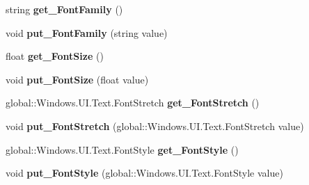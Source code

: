 \begin{DoxyCompactItemize}
string {\bfseries get\+\_\+\+Font\+Family} ()
\item 
\mbox{\label{class_microsoft_1_1_graphics_1_1_canvas_1_1_text_1_1_canvas_text_format_a7b755c0c506c4ca08e5019ddb932ce37}} 
void {\bfseries put\+\_\+\+Font\+Family} (string value)
\item 
\mbox{\label{class_microsoft_1_1_graphics_1_1_canvas_1_1_text_1_1_canvas_text_format_a373a244b91f0a4a9b07a9757f2abd097}} 
float {\bfseries get\+\_\+\+Font\+Size} ()
\item 
\mbox{\label{class_microsoft_1_1_graphics_1_1_canvas_1_1_text_1_1_canvas_text_format_a218056f08c9d5a288afaaa910a6dcf20}} 
void {\bfseries put\+\_\+\+Font\+Size} (float value)
\item 
\mbox{\label{class_microsoft_1_1_graphics_1_1_canvas_1_1_text_1_1_canvas_text_format_a8fa0c462a565f04478992f537b8bbeef}} 
global\+::\+Windows.\+U\+I.\+Text.\+Font\+Stretch {\bfseries get\+\_\+\+Font\+Stretch} ()
\item 
\mbox{\label{class_microsoft_1_1_graphics_1_1_canvas_1_1_text_1_1_canvas_text_format_aa85c44efbe5ca7507a1097874442af9f}} 
void {\bfseries put\+\_\+\+Font\+Stretch} (global\+::\+Windows.\+U\+I.\+Text.\+Font\+Stretch value)
\item 
\mbox{\label{class_microsoft_1_1_graphics_1_1_canvas_1_1_text_1_1_canvas_text_format_a5fab02754b096992ec1e1c2dc34b5ef1}} 
global\+::\+Windows.\+U\+I.\+Text.\+Font\+Style {\bfseries get\+\_\+\+Font\+Style} ()
\item 
\mbox{\label{class_microsoft_1_1_graphics_1_1_canvas_1_1_text_1_1_canvas_text_format_aa2253289e234f2661633eec99949cfc4}} 
void {\bfseries put\+\_\+\+Font\+Style} (global\+::\+Windows.\+U\+I.\+Text.\+Font\+Style value)
\item 

\end{DoxyCompactItemize}
